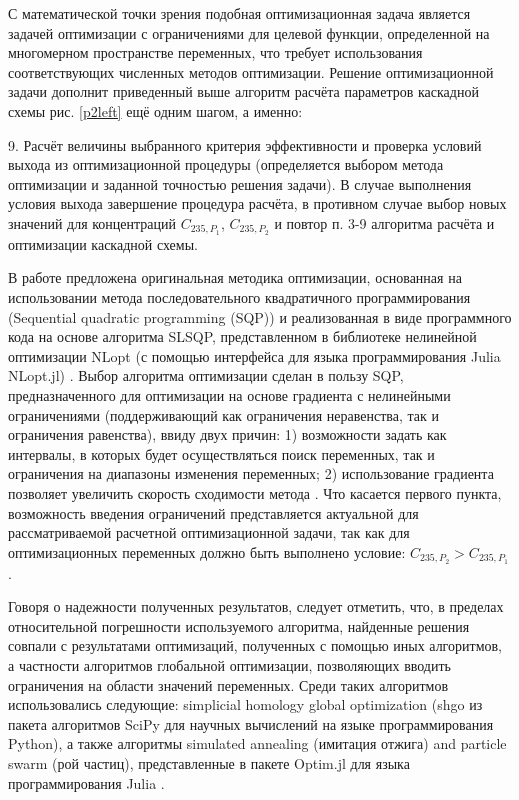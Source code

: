 С математической точки зрения подобная оптимизационная задача является задачей оптимизации с ограничениями для целевой функции, определенной на многомерном пространстве переменных, что требует использования соответствующих численных методов оптимизации. Решение оптимизационной задачи дополнит приведенный выше алгоритм расчёта параметров каскадной схемы рис. \ref{p2left} ещё одним шагом, а именно: 

9. Расчёт величины выбранного критерия эффективности и проверка условий выхода из оптимизационной процедуры (определяется выбором метода оптимизации и заданной точностью решения задачи). В случае выполнения условия выхода завершение процедура расчёта, в противном случае выбор новых значений для концентраций $C_{235,{P_1}}$, $C_{235,{P_2}}$ и повтор п. 3-9 алгоритма расчёта и оптимизации каскадной схемы. 

В работе предложена оригинальная методика оптимизации, основанная на использовании метода последовательного квадратичного программирования (Sequential quadratic programming (SQP)) и реализованная в виде программного кода на основе алгоритма SLSQP, представленном в библиотеке нелинейной оптимизации NLopt (с помощью интерфейса для языка программирования Julia NLopt.jl) \cite{NLopt}. Выбор алгоритма оптимизации сделан в пользу SQP, предназначенного для оптимизации на основе градиента с нелинейными ограничениями (поддерживающий как ограничения неравенства, так и ограничения равенства), ввиду двух причин: 1) возможности задать как интервалы, в которых будет осуществляться поиск переменных, так и ограничения на диапазоны изменения переменных; 2) использование градиента позволяет увеличить скорость сходимости метода \cite{NumericalOptimization2006}. Что касается первого пункта, возможность введения ограничений представляется актуальной для рассматриваемой расчетной оптимизационной задачи, так как для оптимизационных переменных должно быть выполнено условие: ${C_{235,{P_2}}}>{C_{235,{P_1}}}$. 

Говоря о надежности полученных результатов, следует отметить, что, в пределах относительной погрешности используемого алгоритма, найденные решения совпали с результатами оптимизаций, полученных с помощью иных алгоритмов, а частности алгоритмов глобальной оптимизации, позволяющих вводить ограничения на области значений переменных. Среди таких алгоритмов использовались следующие: simplicial homology global optimization (shgo из пакета алгоритмов SciPy для научных вычислений на языке программирования Python), а также алгоритмы simulated annealing (имитация отжига) and particle swarm (рой частиц), представленные в пакете Optim.jl для языка программирования Julia \cite{virtanenSciPyFundamentalAlgorithms2020a, 2020SciPy-NMeth, mogensenOptimMathematicalOptimization2018}.

